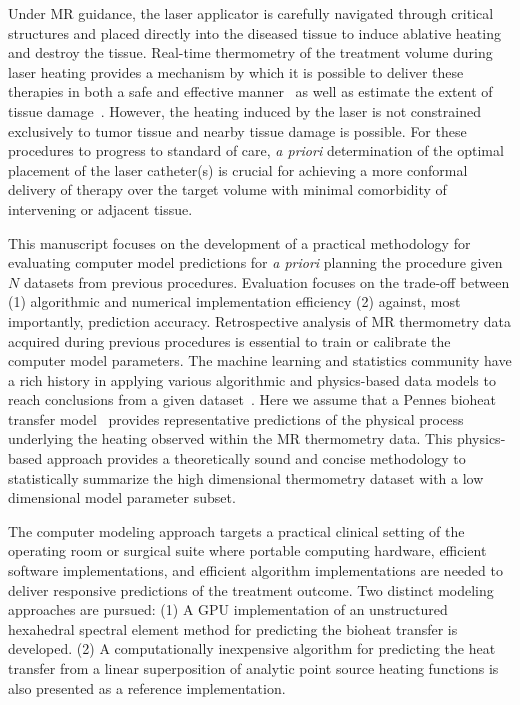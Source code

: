 \documentclass[12pt]{article}
\begin{document}
Under MR guidance, the laser applicator is carefully navigated through
critical structures and placed directly into the diseased tissue to induce
ablative heating and destroy the tissue. 
Real-time thermometry of the treatment volume during
laser heating provides a mechanism by which it is possible to deliver
these therapies in both a safe and effective 
manner~\cite{rieke2008mr, denis2005magnetic,stafford2010magnetic,
woodrum2010feasibility} as well as estimate the extent of tissue
damage~\cite{hyperthermia2003basic,mcdannold2006uterine,mcnichols2004technical}. 
However, the heating induced by the laser is not constrained exclusively
to tumor tissue and nearby tissue damage is possible. 
For these procedures to progress to standard of care, 
\textit{a priori} determination of the optimal placement of the laser catheter(s) is crucial
for achieving a more conformal delivery of therapy over the target volume
with minimal comorbidity of intervening or adjacent tissue. 

This manuscript focuses on the development of a practical methodology for
evaluating computer model predictions for \textit{a priori} planning the procedure  
given $N$ datasets from previous procedures.
Evaluation focuses on the trade-off between (1) algorithmic and numerical
implementation efficiency (2) against, most importantly, prediction accuracy.
Retrospective analysis of MR thermometry data acquired during previous procedures is
essential to train or calibrate the computer model parameters. 
The machine learning and statistics community have a rich history in
applying various algorithmic and physics-based data models to reach conclusions from a
given dataset~\cite{Breiman2001,Hastie2005}. 
Here we assume that a Pennes bioheat transfer model~\cite{Pennes1948} provides
representative predictions of the  physical process underlying the heating
observed within the MR thermometry data.
This physics-based approach
provides a theoretically sound and concise methodology to statistically summarize the high
dimensional thermometry dataset with a low dimensional model parameter subset. 

The computer modeling approach targets a practical clinical setting of the operating room 
or surgical suite where portable computing hardware, efficient software implementations,
and efficient algorithm implementations are needed to deliver responsive predictions
of the treatment outcome.  Two distinct modeling approaches are pursued: 
(1) A GPU implementation of an unstructured hexahedral spectral element method
for predicting the bioheat transfer is developed. 
(2) A computationally inexpensive algorithm for predicting the heat transfer
from a linear superposition of analytic point source heating functions is also
presented as a reference implementation.
\end{document}
